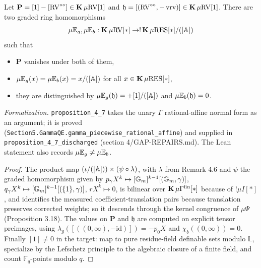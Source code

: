 \setcounter{theorem}{6}
\begin{proposition}
\label{prop-eu-retr-k}
\leanok
{}
Let $\mathbf{P} = [1] - [\mathrm{RV}^{\circ\circ}] \in \operatorname{\mathbf{K}} \mu\mathrm{RV}[1]$ and $\mathfrak{h} = [(\mathrm{RV}^{\circ\circ}, -\operatorname{vrv})] \in \operatorname{\mathbf{K}} \mu\mathrm{RV}[1]$. There are two graded ring homomorphisms \[ \mu\mathbb{E}_g, \mu\mathbb{E}_b : \operatorname{\mathbf{K}} \mu\mathrm{RV}[*] \to !\operatorname{\mathbf{K}} \mu\mathrm{RES}[*] / ([\mathbb{A}]) \] such that \begin{itemize} \item $\mathbf{P}$ vanishes under both of them, \item $\mu\mathbb{E}_g(x) = \mu\mathbb{E}_b(x) = x / ([\mathbb{A}])$ for all $x \in \operatorname{\mathbf{K}} \mu\mathrm{RES}[*]$, \item they are distinguished by $\mu\mathbb{E}_g(\mathfrak{h}) = +[1] / ([\mathbb{A}])$ and $\mu\mathbb{E}_b(\mathfrak{h}) = 0$. \end{itemize}

\emph{Formalization.} \texttt{proposition\_4\_7} takes the unary $\Gamma$ rational-affine normal form as an argument; it is proved (\texttt{Section5.GammaQE.gamma\_piecewise\_rational\_affine}) and supplied in \texttt{proposition\_4\_7\_discharged} (section 4/GAP-REPAIRS.md). The Lean statement also records $\mu\mathbb{E}_g \neq \mu\mathbb{E}_b$.
\end{proposition}

\begin{proof}
\leanok
The product map $(\iota / ([\mathbb{A}])) \times (\psi \circ \lambda)$, with $\lambda$ from Remark 4.6 and $\psi$ the graded homomorphism given by $p_\gamma X^k \mapsto [\mathbb{G}_m]^{k-1}[(\mathbb{G}_m, \gamma)]$, $q_\gamma X^k \mapsto [\mathbb{G}_m]^{k-1}[(\{1\}, \gamma)]$, $r X^k \mapsto 0$, is bilinear over $\operatorname{\mathbf{K}} \mu\Gamma^{\mathrm{fin}}[*]$ because of $!\mu I[*]$, and identifies the measured coefficient-translation pairs because translation preserves corrected weights; so it descends through the kernel congruence of $\mu\Psi$ (Proposition 3.18). The values on $\mathbf{P}$ and $\mathfrak{h}$ are computed on explicit tensor preimages, using $\lambda_g([((0, \infty), -\mathrm{id})]) = -p_0 X$ and $\chi_b((0, \infty)) = 0$. Finally $[1] \neq 0$ in the target: map to pure residue-field definable sets modulo $\mathbb{L}$, specialize by the Lefschetz principle to the algebraic closure of a finite field, and count $\mathbb{F}_q$-points modulo $q$.
\end{proof}

